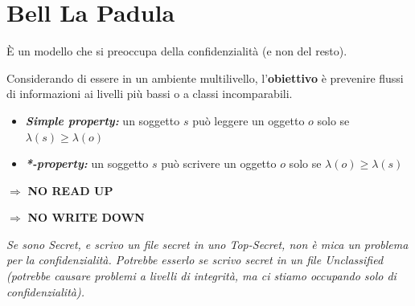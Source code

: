 \documentclass{report}
\begin{document}
\section{Bell La Padula}
È un modello che si preoccupa della confidenzialità (e non del resto).

\noindent Considerando di essere in un ambiente multilivello, l'\textbf{obiettivo} è 
prevenire flussi di informazioni ai livelli più bassi o a classi incomparabili.

\begin{itemize}
    \item \textbf{\textit{Simple property:}} un soggetto $s$ può leggere un oggetto 
    $o$ solo se $\lambda(s) \geq \lambda(o)$
    \item \textbf{\textit{*-property:}} un soggetto $s$ può scrivere un oggetto $o$ solo 
    se $\lambda(o) \geq \lambda(s)$
\end{itemize}

$\Rightarrow$ \textbf{NO READ UP}

$\Rightarrow$ \textbf{NO WRITE DOWN}

\noindent \textit{Se sono Secret, e scrivo un file secret in uno Top-Secret, non è mica un problema 
per la confidenzialità. Potrebbe esserlo se scrivo secret in un file Unclassified (potrebbe causare problemi a livelli di integrità, ma ci stiamo occupando solo di confidenzialità).}
\end{document}
